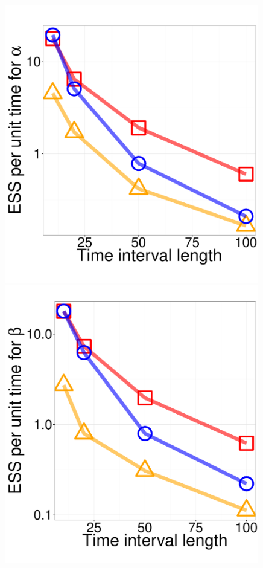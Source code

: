 {\begin{figure}
\begin{minipage}[hp]{0.24\linewidth}
  \end{minipage}
  \begin{minipage}[hp]{0.24\linewidth}
  \centering
    \includegraphics [width=0.99\textwidth, angle=0]{figs/ESS_vs_t_alpha.pdf}
      \end{minipage}
  \begin{minipage}[hp]{0.24\linewidth}
  \centering
    \includegraphics [width=0.99\textwidth, angle=0]{figs/ESS_vs_t_beta.pdf}

\end{minipage}
\end{figure}}
